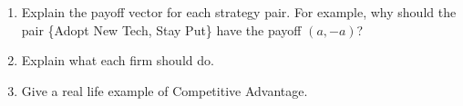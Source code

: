 \begin{enumerate}
\vspace{.1in}

\begin{enumerate}
\item Explain the payoff vector for each strategy pair. For example, why should the pair \{Adopt New Tech, Stay Put\} have the payoff $(a, -a)$?

\item Explain what each firm should do.

\item Give a real life example of Competitive Advantage.

\end{enumerate}

\end{enumerate}



 